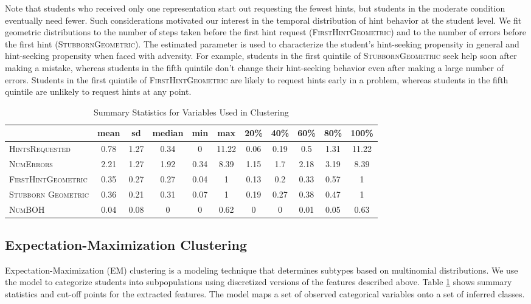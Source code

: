 \documentclass{edm_template}
\newcommand{\ftr}[1]{\textsc{#1}}
\begin{document}
Note that students who received only one representation start out requesting the fewest hints, but students in the moderate condition eventually need fewer. Such considerations motivated our interest in the temporal distribution of hint behavior at the student level. We fit geometric distributions to the number of steps taken before the first hint request (\ftr{FirstHintGeometric}) and to the number of errors before the first hint (\ftr{StubbornGeometric}). The estimated parameter is used to characterize the student's hint-seeking propensity in general and hint-seeking propensity when faced with adversity. For example, students in the first quintile of \ftr{StubbornGeometric} seek help soon after making a mistake, whereas students in the fifth quintile don't change their hint-seeking behavior even after making a large number of errors. Students in the first quintile of \ftr{FirstHintGeometric} are likely to request hints early in a problem, whereas students in the fifth quintile are unlikely to request hints at any point.
\begin{table}[htbp]
\caption{Summary Statistics for Variables Used in Clustering}
\begin{center}
\begin{tabular}{| l || c | c || c | c | c || c | c | c | c | c |}
\hline
&mean& sd&median&min&max&20\%&40\%&60\%&	80\%&100\%\\ \hline \hline
\ftr{HintsRequested}&0.78&1.27&0.34&0&11.22&0.06&0.19&0.5&1.31&11.22\\ \hline
\ftr{NumErrors}&2.21&1.27&1.92&0.34&8.39&1.15&1.7&2.18&3.19&8.39\\ \hline 
\ftr{FirstHintGeometric}&0.35&0.27&0.27&0.04&1&0.13&0.2&0.33&0.57&1\\ \hline
\ftr{Stubborn Geometric}&0.36&0.21&0.31&0.07&1&0.19&0.27&0.38&0.47&1\\ \hline
\ftr{NumBOH}&0.04&0.08&0&0&0.62&0&0&0.01&0.05&0.63\\ \hline
 \end{tabular}
\end{center}
\label{tab:sumstats}
\end{table}

\subsection{Expectation-Maximization Clustering}
\label{sec:EM-clust}

Expectation-Maximization (EM) clustering is a modeling technique that determines subtypes based on multinomial distributions. We use the model to categorize students into subpopulations using discretized versions of the features described above. Table \ref{tab:sumstats} shows summary statistics and cut-off points for the extracted features. The model maps a set of observed categorical variables onto a set of inferred classes. 
\end{document}
